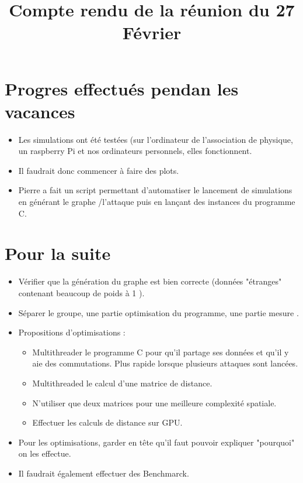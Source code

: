 \documentclass{article}
\title{Compte rendu de la réunion du 27 Février}
\date{}
\begin{document}
	
\maketitle
	
\section*{Progres effectués pendan les vacances}
	\begin{itemize}
		\item Les simulations ont été testées
			(sur l'ordinateur de l'association de physique, un raspberry Pi
			et nos ordinateurs personnels, elles fonctionnent. 
		\item Il faudrait donc commencer à faire des plots. 
		\item Pierre a fait un script permettant d'automatiser le lancement de simulations en générant le graphe 
			/l'attaque puis en lançant des instances du programme C. 
	\end{itemize}
\newpage
	
\section*{Pour la suite}
	\begin{itemize}
			\item Vérifier que la génération du graphe est bien correcte (données "étranges" contenant beaucoup de poids à 1 ). 
			\item Séparer le groupe, une partie optimisation du programme, une partie mesure . 
			\item Propositions d'optimisations :
				\begin{itemize} 
				\item Multithreader le programme C pour qu'il partage ses données et qu'il y aie des commutations. Plus rapide lorsque plusieurs attaques sont lancées.  
				\item Multithreaded le calcul d'une matrice de distance. 
				\item N'utiliser que deux matrices pour une meilleure complexité spatiale. 
				\item Effectuer les calculs de distance sur GPU. 

			\end{itemize}
			\item Pour les optimisations, garder en tête qu'il faut pouvoir expliquer "pourquoi" on les effectue.
		
			\item Il faudrait également effectuer des Benchmarck.
		\end{itemize}
	
\end{document}
